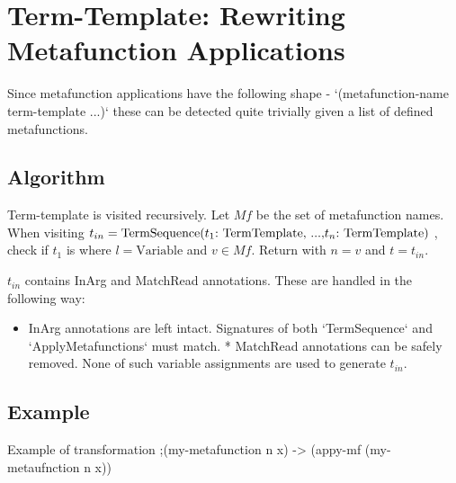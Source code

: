 \section{Term-Template: Rewriting Metafunction Applications}

Since metafunction applications have the following shape - `(metafunction-name term-template ...)` these can be detected quite trivially given a list of defined metafunctions. 

\subsection{Algorithm}
Term-template is visited recursively. Let $Mf$ be the set of metafunction names. When visiting $t_{in}=\text{\TermSequence}$, check if $t_1$ is \TermLiteral where $l=\text{Variable}$ and $v \in Mf$. Return \ApplyMetafunction with $n=v$ and $t=t_{in}$.

$t_{in}$ contains InArg and MatchRead annotations. These are handled in the following way:

\begin{itemize}
\item
InArg annotations are left intact. Signatures of both `TermSequence` and `ApplyMetafunctions` must match.
* MatchRead annotations can be safely removed. None of such variable assignments are used to generate $t_{in}$.
\end{itemize}



\subsection{Example}
Example of transformation ;(my-metafunction n x) -> (appy-mf (my-metaufnction n x))
